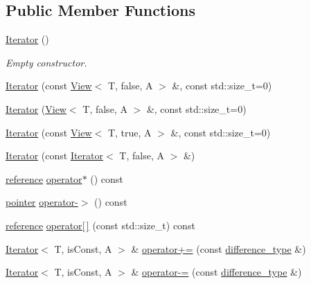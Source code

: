 \subsection*{Public Member Functions}
\begin{DoxyCompactItemize}
\item 
\hyperlink{classandres_1_1Iterator_a6a97994e2999c992ed829b3da6c748bf}{Iterator} ()
\begin{DoxyCompactList}\small\item\em Empty constructor. \end{DoxyCompactList}\item 
\hyperlink{classandres_1_1Iterator_a7b3a9873e6c06df90bd70a0262c90de1}{Iterator} (const \hyperlink{classandres_1_1View}{View}$<$ T, false, A $>$ \&, const std\+::size\+\_\+t=0)
\item 
\hyperlink{classandres_1_1Iterator_a182a2080c203da0d9a92045e12c0ac9d}{Iterator} (\hyperlink{classandres_1_1View}{View}$<$ T, false, A $>$ \&, const std\+::size\+\_\+t=0)
\item 
\hyperlink{classandres_1_1Iterator_aba0cdb5062a14318d9c45c6c71646285}{Iterator} (const \hyperlink{classandres_1_1View}{View}$<$ T, true, A $>$ \&, const std\+::size\+\_\+t=0)
\item 
\hyperlink{classandres_1_1Iterator_a6c650c1a0c2ae10324cb33cb22336172}{Iterator} (const \hyperlink{classandres_1_1Iterator}{Iterator}$<$ T, false, A $>$ \&)
\item 
\hyperlink{classandres_1_1Iterator_a9805f26813688f04c33e798f7999e5f7}{reference} \hyperlink{classandres_1_1Iterator_aa98dec12fce71115edb4e9d3f9454bac}{operator$\ast$} () const
\item 
\hyperlink{classandres_1_1Iterator_adf2ba3f1a3cc9c98bff9c544afdb22f9}{pointer} \hyperlink{classandres_1_1Iterator_a1299459201b748ef50d43cf871de510b}{operator-\/$>$} () const
\item 
\hyperlink{classandres_1_1Iterator_a9805f26813688f04c33e798f7999e5f7}{reference} \hyperlink{classandres_1_1Iterator_a1b359b213c766dd83673d96fa73c5a51}{operator\mbox{[}$\,$\mbox{]}} (const std\+::size\+\_\+t) const
\item 
\hyperlink{classandres_1_1Iterator}{Iterator}$<$ T, is\+Const, A $>$ \& \hyperlink{classandres_1_1Iterator_ad35d9bf0e2f5079c444353292f5def0c}{operator+=} (const \hyperlink{classandres_1_1Iterator_a10f8053d87b6b597d9fe011f66a240ca}{difference\+\_\+type} \&)
\item 
\hyperlink{classandres_1_1Iterator}{Iterator}$<$ T, is\+Const, A $>$ \& \hyperlink{classandres_1_1Iterator_a2d9d6f6b6b9c3e1843f00b3162f9dfeb}{operator-\/=} (const \hyperlink{classandres_1_1Iterator_a10f8053d87b6b597d9fe011f66a240ca}{difference\+\_\+type} \&)

\end{DoxyCompactItemize}
